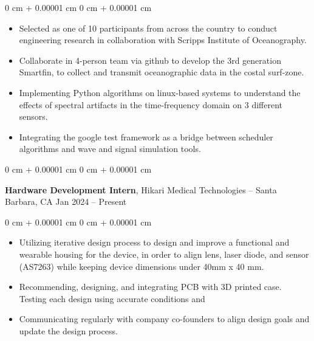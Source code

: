 \documentclass[10pt, letterpaper]{article}
\newenvironment{highlights}{
    \begin{itemize}[
        topsep=0.10 cm,
        parsep=0.10 cm,
        partopsep=0pt,
        itemsep=0pt,
        leftmargin=0 cm + 10pt
    ]
}{
    \end{itemize}
} %
\newenvironment{onecolentry}{
    \begin{adjustwidth}{
        0 cm + 0.00001 cm
    }{
        0 cm + 0.00001 cm
    }
}{
    \end{adjustwidth}
} %
\newenvironment{twocolentry}[2][]{
    \onecolentry
    \def\secondColumn{#2}
    \setcolumnwidth{\fill, 4.5 cm}
    \begin{paracol}{2}
}{
    \switchcolumn \raggedleft \secondColumn
    \end{paracol}
    \endonecolentry
} %
\begin{document}
    \vspace{0.1 cm}

    \begin{onecolentry}
        \begin{highlights}
            \item Selected as one of 10 participants from across the country to conduct engineering research in collaboration with Scripps Institute of Oceanography.
            \item Collaborate in 4-person team via github to develop the 3rd generation Smartfin, to collect and transmit oceanographic data in the costal surf-zone.
            \item Implementing Python algorithms on linux-based systems to understand the effects of spectral artifacts in the time-frequency domain on 3 different sensors. 
            \item Integrating the google test framework as a bridge between scheduler algorithms and wave and signal simulation tools.
        \end{highlights}
    \end{onecolentry}


    \vspace{0.2 cm}
    
    \begin{twocolentry}{
            Jan 2024 – Present
        }
            \textbf{Hardware Development Intern}, Hikari Medical Technologies -- Santa Barbara, CA\end{twocolentry}

        \vspace{0.10 cm}
        \begin{onecolentry}
            \begin{highlights}
                \item Utilizing iterative design process to design and improve a functional and wearable housing for the device, in order to align lens, laser diode, and sensor (AS7263) while keeping device dimensions under 40mm x 40 mm.
                \item Recommending, designing, and integrating PCB with 3D printed case. Testing each design using accurate conditions and 
                \item Communicating regularly with company co-founders to align design goals and update the design process.
            \end{highlights}
        \end{onecolentry}
\end{document}
